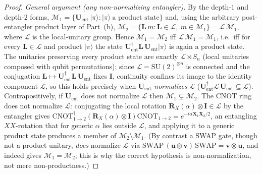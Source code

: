 \documentclass[10pt,a4paper]{amsart}
\newcommand{\CNOT}{\mathrm{CNOT}}
\newcommand{\SU}{\mathrm{SU}}
\newcommand{\cM}{\mathcal{M}}
\begin{document}
\begin{proof}
\emph{General argument (any non-normalizing entangler).}
By the depth-$1$ and depth-$2$ forms,
$\cM_1=\{\mathbf{U}_{\mathrm{ent}}\,|\pi\rangle:|\pi\rangle\ \text{a product state}\}$
and, using the arbitrary post-entangler product layer of Part~(b),
$\cM_2=\{\mathbf{L}\,m:\mathbf{L}\in\mathcal{L},\ m\in\cM_1\}=\mathcal{L}\,\cM_1$,
where $\mathcal{L}$ is the local-unitary group.  Hence $\cM_1=\cM_2$ iff
$\mathcal{L}\,\cM_1=\cM_1$, i.e.\ iff for every $\mathbf{L}\in\mathcal{L}$ and
product $|\pi\rangle$ the state
$\mathbf{U}_{\mathrm{ent}}^{\dagger}\mathbf{L}\,\mathbf{U}_{\mathrm{ent}}|\pi\rangle$ is again a
product state.  The unitaries preserving every product state are exactly
$\mathcal{L}\rtimes S_n$ (local unitaries composed with qubit permutations);
since $\mathcal{L}=\SU(2)^{\otimes n}$ is connected and the conjugation
$\mathbf{L}\mapsto\mathbf{U}_{\mathrm{ent}}^{\dagger}\mathbf{L}\,\mathbf{U}_{\mathrm{ent}}$ fixes
$\mathbf{I}$, continuity confines its image to the identity component
$\mathcal{L}$, so this holds precisely when $\mathbf{U}_{\mathrm{ent}}$
\emph{normalizes} $\mathcal{L}$
($\mathbf{U}_{\mathrm{ent}}^{\dagger}\mathcal{L}\,\mathbf{U}_{\mathrm{ent}}\subseteq\mathcal{L}$).
Contrapositively, if $\mathbf{U}_{\mathrm{ent}}$ does not normalize $\mathcal{L}$
then $\cM_1\subsetneq\cM_2$.  The CNOT ring does not normalize
$\mathcal{L}$: conjugating the local rotation
$\mathbf{R}_X(\alpha)\otimes\mathbf{I}\in\mathcal{L}$ by the entangler gives
$\CNOT_{1\to2}^{\dagger}(\mathbf{R}_X(\alpha)\otimes\mathbf{I})\CNOT_{1\to2}
=e^{-i\alpha\mathbf{X}_1\mathbf{X}_2/2}$, an entangling $XX$-rotation that for
generic $\alpha$ lies outside $\mathcal{L}$, and applying it to a generic
product state produces a member of $\cM_2\setminus\cM_1$.  (By contrast a SWAP
gate, though not a product unitary, \emph{does} normalize $\mathcal{L}$
via $\mathrm{SWAP}\,(\mathbf{u}\otimes\mathbf{v})\,\mathrm{SWAP}=\mathbf{v}\otimes\mathbf{u}$, and
indeed gives $\cM_1=\cM_2$; this is why the correct hypothesis is
non-normalization, not mere non-productness.)
\end{proof}
\end{document}
